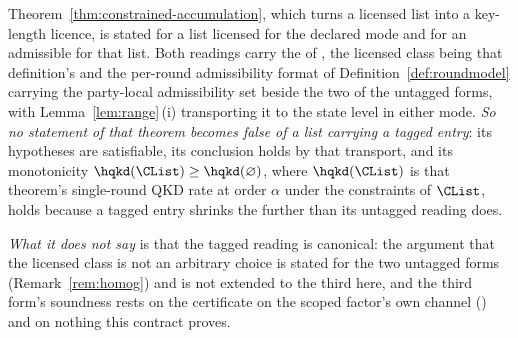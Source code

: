 
\begin{remark}\label{rem:tagged-entries-and-accumulation}
Theorem~\ref{thm:constrained-accumulation}, which turns a licensed list into a
key-length licence, is stated for a list licensed for the declared mode and
for an  admissible for that list. Both readings carry
the  of , the
licensed class being that definition's and the per-round admissibility format
of Definition~\ref{def:roundmodel} carrying the party-local admissibility set
beside the two of the untagged forms, with
Lemma~\ref{lem:range}\,(i) transporting it to the state level in either
mode. \emph{So no statement of that theorem becomes false of a list carrying
a tagged entry}: its hypotheses are satisfiable, its conclusion holds by that
transport, and its monotonicity $\hqkd(\CList)\ge\hqkd(\varnothing)$, where
$\hqkd(\CList)$ is that theorem's single-round QKD rate at order $\alpha$
under the constraints of $\CList$, holds because a tagged entry shrinks the
 further than its untagged reading does.

\emph{What it does not say} is that the tagged reading is canonical: the
argument that the licensed class is not an arbitrary choice is stated for the
two untagged forms (Remark~\ref{rem:homog}) and is not extended to the third
here, and the third form's soundness rests on the certificate on the scoped
factor's own channel () and
on nothing this contract proves.


\end{remark}
